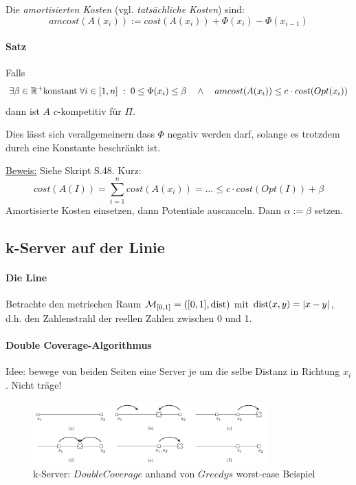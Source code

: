 Die \emph{amortisierten Kosten} (vgl. \emph{tatsächliche Kosten}) sind:
$$ amcost(A(x_i)) := cost(A(x_i)) + \Phi(x_i) - \Phi(x_{i-1})$$

\paragraph{Satz}
Falls
$$ \exists \beta \in \mathbb{R}^+ \text{konstant} \; \forall i \in [1,n] \; : \; 0 \leq \Phi(x_i) \leq \beta
\quad \wedge \quad
amcost(A(x_i)) \leq c \cdot cost(Opt(x_i))
$$
dann ist $A$ $c$-kompetitiv für $\Pi$.

Dies lässt sich verallgemeinern dass $\Phi$ negativ werden darf, solange es trotzdem durch
eine Konstante beschränkt ist.

\underline{Beweis:}
Siehe Skript S.48. Kurz:
$$ cost(A(I)) = \sum_{i=1}^n cost(A(x_i)) = \dots \leq c \cdot cost(Opt(I)) + \beta $$
Amortisierte Kosten einsetzen, dann Potentiale auscanceln. Dann $\alpha := \beta$ setzen.

\subsection{k-Server auf der Linie}

\paragraph{Die Line}
Betrachte den metrischen Raum $\mathcal{M}_{[0,1]} = ([0,1], \text{dist})$ mit $\text{dist}(x,y) = |x-y|$,
d.h. den Zahlenstrahl der reellen Zahlen zwischen 0 und 1.

\paragraph{Double Coverage-Algorithmus}
Idee: bewege von beiden Seiten eine Server je um die selbe Distanz in Richtung $x_i$.
Nicht träge!

\begin{figure}[h]
    \centering
    \includegraphics[width=0.8\textwidth]{images/k-server-double-coverage.png}
    \caption{k-Server: $DoubleCoverage$ anhand von $Greedys$ worst-case Beispiel}
    \label{k-server-double-coverage}
\end{figure}

